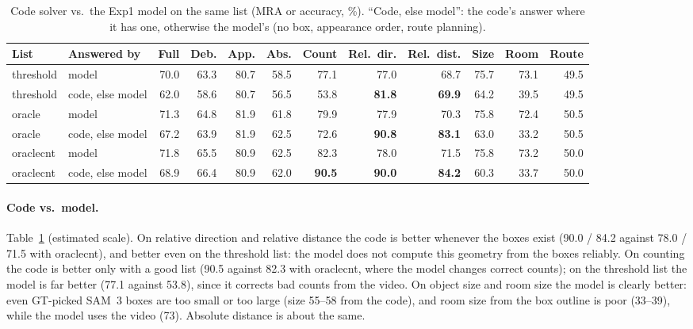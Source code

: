 \begin{table}[h]
\centering
\caption{Code solver vs.\ the Exp1 model on the same list (MRA or accuracy, \%). ``Code, else model'': the code's answer
where it has one, otherwise the model's (no box, appearance order, route planning).}
\label{tab:agent-code-model}
\small
\setlength{\tabcolsep}{4pt}
\begin{tabular}{llrrrrrrrrrr}
\toprule
List & Answered by & Full & Deb. & App. & Abs. & Count & Rel.\ dir. & Rel.\ dist. & Size & Room & Route \\
\midrule
threshold & model            & 70.0 & 63.3 & 80.7 & 58.5 & 77.1 & 77.0 & 68.7 & 75.7 & 73.1 & 49.5 \\
threshold & code, else model & 62.0 & 58.6 & 80.7 & 56.5 & 53.8 & \textbf{81.8} & \textbf{69.9} & 64.2 & 39.5 & 49.5 \\
\midrule
oracle    & model            & 71.3 & 64.8 & 81.9 & 61.8 & 79.9 & 77.9 & 70.3 & 75.8 & 72.4 & 50.5 \\
oracle    & code, else model & 67.2 & 63.9 & 81.9 & 62.5 & 72.6 & \textbf{90.8} & \textbf{83.1} & 63.0 & 33.2 & 50.5 \\
\midrule
oraclecnt & model            & 71.8 & 65.5 & 80.9 & 62.5 & 82.3 & 78.0 & 71.5 & 75.8 & 73.2 & 50.0 \\
oraclecnt & code, else model & 68.9 & 66.4 & 80.9 & 62.0 & \textbf{90.5} & \textbf{90.0} & \textbf{84.2} & 60.3 & 33.7 & 50.0 \\
\bottomrule
\end{tabular}
\end{table}

\paragraph{Code vs.\ model.}
Table~\ref{tab:agent-code-model} (estimated scale). On relative direction and relative distance the code is better
whenever the boxes exist (90.0 / 84.2 against 78.0 / 71.5 with oraclecnt), and better even on the threshold list: the model
does not compute this geometry from the boxes reliably. On counting the code is better only with a good list (90.5 against
82.3 with oraclecnt, where the model changes correct counts); on the threshold list the model is far better (77.1 against
53.8), since it corrects bad counts from the video. On object size and room size the model is clearly better: even
GT-picked SAM~3 boxes are too small or too large (size 55--58 from the code), and room size from the box outline is poor
(33--39), while the model uses the video (73). Absolute distance is about the same.

